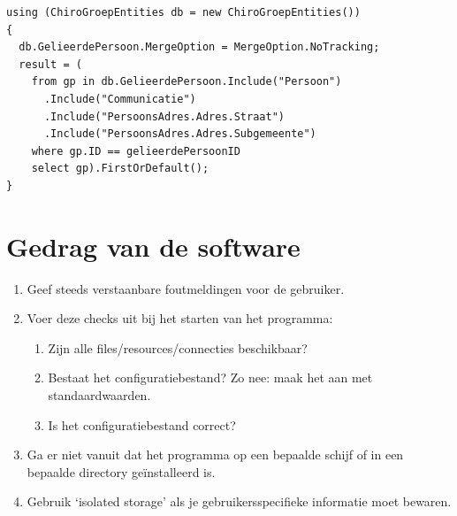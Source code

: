 \documentclass[a4paper,11pt]{article}
\begin{document}

\begin{lstlisting}[float, caption=Entity Framework]
using (ChiroGroepEntities db = new ChiroGroepEntities())
{
  db.GelieerdePersoon.MergeOption = MergeOption.NoTracking;
  result = (
    from gp in db.GelieerdePersoon.Include("Persoon")
      .Include("Communicatie")
      .Include("PersoonsAdres.Adres.Straat")
      .Include("PersoonsAdres.Adres.Subgemeente")
    where gp.ID == gelieerdePersoonID
    select gp).FirstOrDefault();
}
\end{lstlisting}

\section{Gedrag van de software}

\begin{enumerate}[resume]
\item Geef steeds verstaanbare foutmeldingen voor de gebruiker.
\item Voer deze checks uit bij het starten van het programma:
\begin{enumerate}
\item Zijn alle files/resources/connecties beschikbaar?
\item Bestaat het configuratiebestand? Zo nee: maak het aan met standaardwaarden.
\item Is het configuratiebestand correct?
\end{enumerate}
\item Ga er niet vanuit dat het programma op een bepaalde schijf of in een bepaalde directory
ge\"installeerd is.
\item Gebruik `isolated storage' als je gebruikersspecifieke informatie moet bewaren.
\end{enumerate}
\end{document}
